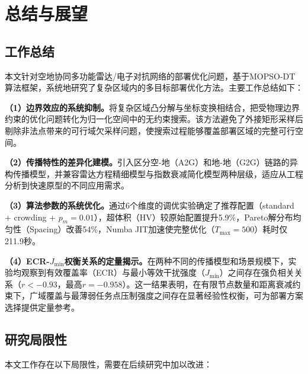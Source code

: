 \section{总结与展望}
\label{sec:conclusion}

\subsection{工作总结}

本文针对空地协同多功能雷达/电子对抗网络的部署优化问题，基于MOPSO-DT算法框架，系统地研究了复杂区域内的多目标部署优化方法。主要工作总结如下：

\textbf{（1）边界效应的系统抑制。}将复杂区域凸分解与坐标变换相结合，把受物理边界约束的优化问题转化为归一化空间中的无约束搜索。该方法避免了外接矩形采样后剔除非法点带来的可行域欠采样问题，使搜索过程能够覆盖部署区域的完整可行空间。

\textbf{（2）传播特性的差异化建模。}引入区分空-地（A2G）和地-地（G2G）链路的异构传播模型，并兼容雷达方程精细模型与指数衰减简化模型两种层级，适应从工程分析到快速原型的不同应用需求。

\textbf{（3）算法参数的系统优化。}通过6个维度的调优实验确定了推荐配置（standard + crowding + $p_m=0.01$），超体积（HV）较原始配置提升5.9\%，Pareto解分布均匀性（Spacing）改善54\%，Numba JIT加速使完整优化（$T_{\max}=500$）耗时仅211.9秒。

\textbf{（4）ECR-$J_{\min}$权衡关系的定量揭示。}在两种不同的传播模型和场景规模下，实验均观察到有效覆盖率（ECR）与最小等效干扰强度（$J_{\min}$）之间存在强负相关关系（$r < -0.93$，最高$r = -0.958$）。这一结果表明，在有限节点数量和距离衰减约束下，广域覆盖与最薄弱任务点压制强度之间存在显著经验性权衡，可为部署方案选择提供定量参考。

\subsection{研究局限性}

本文工作存在以下局限性，需要在后续研究中加以改进：

